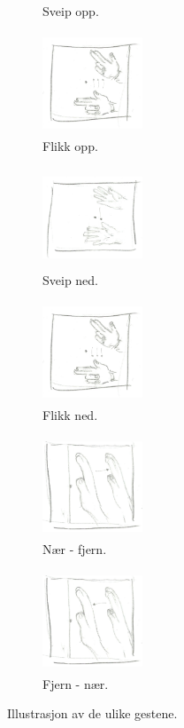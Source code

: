 \begin{figure}[h]
\begin{subfigure}{0.23\textwidth}
\caption{Sveip opp.}
\label{fig:sveip-opp}
\end{subfigure}
\begin{subfigure}{0.23\textwidth}
\includegraphics[width=3cm, height=3cm]{fig/flick-d-u}
\caption{Flikk opp.}
\label{fig:flikk-opp}
\end{subfigure}
\begin{subfigure}{0.23\textwidth}
\includegraphics[width=3cm, height=3cm]{fig/swipe-u-d}
\caption{Sveip ned.}
\label{fig:sveip-ned}
\end{subfigure}
\begin{subfigure}{0.23\textwidth}
\includegraphics[width=3cm, height=3cm]{fig/flick-u-d}
\caption{Flikk ned.}
\label{fig:flikk-ned}
\end{subfigure}
\begin{subfigure}{0.25\textwidth}
\includegraphics[width=3cm, height=3cm]{fig/near-far}
\caption{Nær - fjern.}
\label{fig:n-f}
\end{subfigure}
\begin{subfigure}{0.23\textwidth}
\includegraphics[width=3cm, height=3cm]{fig/far-near}
\caption{Fjern - nær.}
\label{fig:f-n}
\end{subfigure}
\caption{Illustrasjon av de ulike gestene.}
\label{fig:gester}
\end{figure}

